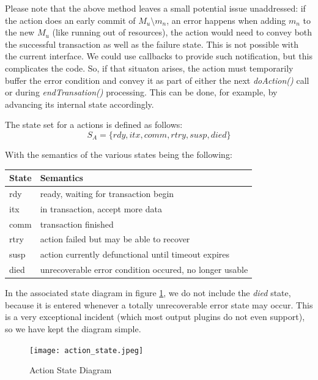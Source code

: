 \documentclass[a4paper,10pt]{article}
\begin{document}
Please note that the above method leaves a small potential issue unaddressed: if the action does an early commit of $M_u \setminus m_n$, an error happens when adding $m_n$ to the new $M_u$ (like running out of resources), the action would need to convey both the successful transaction as well as the failure state. This is not possible with the current interface. We could use callbacks to provide such notification, but this complicates the code. So, if that situaton arises, the action must temporarily buffer the error condition and convey it as part of either the next \emph{doAction()} call or during \emph{endTransation()} processing. This can be done, for example, by advancing its internal state accordingly.

The state set for a actions is defined as follows:
$$
S_A = \{ rdy, itx, comm, rtry, susp, died \}
$$

With the semantics of the various states being the following:

\begin{center}
\begin{tabular}{|l|l|} \hline
	State		& Semantics \\\hline
	rdy 		& ready, waiting for transaction begin\\
	itx		& in transaction, accept more data \\
	comm		& transaction finished \\
	rtry		& action failed but may be able to recover \\
	susp		& action currently defunctional until timeout expires \\
	died		& unrecoverable error condition occured, no longer usable \\\hline
\end{tabular}
\end{center}

In the associated state diagram in figure \ref{fig_action_states}, we do not include the \emph{died} state, because it is entered whenever a totally unrecoverable error state may occur. This is a very exceptional incident (which most output plugins do not even support), so we have kept the diagram simple.

\begin{figure}
\begin{center}
\texttt{[image: action\_state.jpeg]}
\end{center}
\caption{Action State Diagram}
\label{fig_action_states}
\end{figure}
\end{document}
